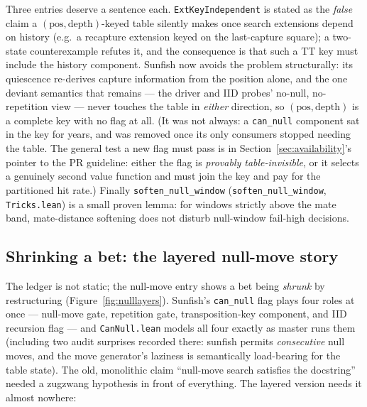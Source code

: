 \documentclass[11pt]{article}
\newcommand{\leanref}[2]{(\texttt{#1}, \texttt{#2})}%
\theoremstyle{plain}
\theoremstyle{definition}
\theoremstyle{remark}
\begin{document}
Three entries deserve a sentence each.  \texttt{ExtKeyIndependent} is
stated as the \emph{false} claim a $(\mathrm{pos},\mathrm{depth})$-keyed
table silently makes once search extensions depend on history (e.g.\ a
recapture extension keyed on the last-capture square); a two-state
counterexample refutes it, and the consequence is that such a TT key
must include the history component.  Sunfish now avoids the problem
structurally: its quiescence re-derives capture information from the
position alone, and the one deviant semantics that remains --- the
driver and IID probes' no-null, no-repetition view --- never touches
the table in \emph{either} direction, so $(\mathrm{pos},
\mathrm{depth})$ is a complete key with no flag at all.  (It was not
always: a \texttt{can\_null} component sat in the key for years, and
was removed once its only consumers stopped needing the table.  The
general test a new flag must pass is in
Section~\ref{sec:availability}'s pointer to the PR guideline: either
the flag is \emph{provably table-invisible}, or it selects a genuinely
second value function and must join the key and pay for the
partitioned hit rate.)  Finally
\texttt{soften\_null\_window} \leanref{soften\_null\_window}{Tricks.lean}
is a small proven lemma: for windows strictly above the mate band,
mate-distance softening does not disturb null-window fail-high
decisions.

\subsection{Shrinking a bet: the layered null-move story}
\label{sec:nullmove}

The ledger is not static; the null-move entry shows a bet being
\emph{shrunk} by restructuring (Figure~\ref{fig:nulllayers}).  Sunfish's
\texttt{can\_null} flag plays four roles at once --- null-move gate,
repetition gate, transposition-key component, and IID recursion flag ---
and \texttt{CanNull.lean} models all four exactly as master runs them
(including two audit surprises recorded there: sunfish permits
\emph{consecutive} null moves, and the move generator's laziness is
semantically load-bearing for the table state).  The old, monolithic
claim ``null-move search satisfies the docstring'' needed a zugzwang
hypothesis in front of everything.  The layered version needs it almost
nowhere:
\end{document}
